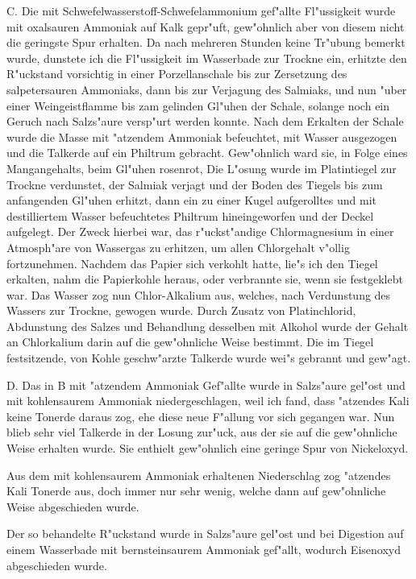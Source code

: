 \documentclass[a4paper, 11pt, oneside]{article}
\begin{document}
C. Die mit Schwefelwasserstoff-Schwefelammonium gef"allte Fl"ussigkeit wurde mit oxalsauren Ammoniak auf Kalk gepr"uft, gew"ohnlich aber von diesem nicht die geringste Spur erhalten. Da nach mehreren Stunden keine Tr"ubung bemerkt wurde, dunstete ich die Fl"ussigkeit im Wasserbade zur Trockne ein, erhitzte den R"uckstand vorsichtig in einer Porzellanschale bis zur Zersetzung des salpetersauren Ammoniaks, dann bis zur Verjagung des Salmiaks, und nun "uber einer Weingeistflamme bis zam gelinden Gl"uhen der Schale, solange noch ein Geruch nach Salzs"aure versp"urt werden konnte. Nach dem Erkalten der Schale wurde die Masse mit "atzendem Ammoniak befeuchtet, mit Wasser ausgezogen und die Talkerde auf ein Philtrum gebracht. Gew"ohnlich ward sie, in Folge eines Mangangehalts, beim Gl"uhen rosenrot, Die L"osung wurde im Platintiegel zur Trockne verdunstet, der Salmiak verjagt und der Boden des Tiegels bis zum anfangenden Gl"uhen erhitzt, dann ein zu einer Kugel aufgerolltes und mit destilliertem Wasser befeuchtetes Philtrum hineingeworfen und der Deckel aufgelegt. Der Zweck hierbei war, das r"uckst"andige Chlormagnesium in einer Atmosph"are von Wassergas zu erhitzen, um allen Chlorgehalt v"ollig fortzunehmen. Nachdem das Papier sich verkohlt hatte, lie"s ich den Tiegel erkalten, nahm die Papierkohle heraus, oder verbrannte sie, wenn sie festgeklebt war. Das Wasser zog nun Chlor-Alkalium aus, welches, nach Verdunstung des Wassers zur Trockne, gewogen wurde. Durch Zusatz von Platinchlorid, Abdunstung des Salzes und Behandlung desselben mit Alkohol wurde der Gehalt an Chlorkalium darin auf die gew"ohnliche Weise bestimmt. Die im Tiegel festsitzende, von Kohle geschw"arzte Talkerde wurde wei"s gebrannt und gew"agt.

D. Das in B mit "atzendem Ammoniak Gef"allte wurde in Salzs"aure gel"ost und mit kohlensaurem Ammoniak niedergeschlagen, weil ich fand, dass "atzendes Kali keine Tonerde daraus zog, ehe diese neue F"allung vor sich gegangen war. Nun blieb sehr viel Talkerde in der Losung zur"uck, aus der sie auf die gew"ohnliche Weise erhalten wurde. Sie enthielt gew"ohnlich eine geringe Spur von Nickeloxyd.

Aus dem mit kohlensaurem Ammoniak erhaltenen Niederschlag zog "atzendes Kali Tonerde aus, doch immer nur sehr wenig, welche dann auf gew"ohnliche Weise abgeschieden wurde.

Der so behandelte R"uckstand wurde in Salzs"aure gel"ost und bei Digestion auf einem Wasserbade mit bernsteinsaurem Ammoniak gef"allt, wodurch Eisenoxyd abgeschieden wurde.
\end{document}
